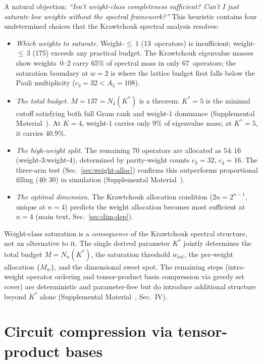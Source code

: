 \documentclass[twocolumn,prx,aps,superscriptaddress,longbibliography,floatfix]{revtex4-2}
\begin{document}
A natural objection: \emph{``Isn't weight-class completeness
sufficient?  Can't I just saturate low weights without the
spectral framework?''}  This heuristic contains four undetermined
choices that the Krawtchouk spectral analysis resolves:
\begin{itemize}
\item \emph{Which weights to saturate.}  Weight-${\le}\,1$
(13~operators) is insufficient; weight-${\le}\,3$ (175) exceeds
any practical budget.  The Krawtchouk eigenvalue masses show
weights~0--2 carry 65\% of spectral mass in only 67~operators; the
saturation boundary at $w = 2$ is where the lattice budget first
falls below the Pauli multiplicity ($c_3 = 32 < A_3 = 108$).
\item \emph{The total budget.}  $M = 137 = N_4(K^*)$ is a theorem:
$K^* = 5$ is the minimal cutoff satisfying both full Gram rank and
weight-$1$ dominance (Supplemental Material~\cite{supplemental}).  At $K = 4$,
weight-$1$ carries only 9\% of eigenvalue mass; at $K^* = 5$, it
carries 40.9\%.
\item \emph{The high-weight split.}  The remaining 70 operators are
allocated as $54{:}16$ (weight-$3$:weight-$4$), determined by
parity-weight counts $c_3 = 32$, $c_4 = 16$.  The three-arm test
(Sec.~\ref{sec:weight-alloc}) confirms this outperforms proportional
filling ($40{:}30$) in simulation
(Supplemental Material~\cite{supplemental}).
\item \emph{The optimal dimension.}  The Krawtchouk allocation
condition ($2n = 2^{n-1}$, unique at $n = 4$) predicts the weight
allocation becomes most sufficient at $n = 4$
(main text, Sec.~\ref{sec:dim-dep}).
\end{itemize}
Weight-class saturation is a \emph{consequence} of the Krawtchouk
spectral structure, not an alternative to it.
The single derived parameter $K^*$ jointly determines the total
budget $M = N_n(K^*)$, the saturation threshold
$w_{\mathrm{sat}}$, the per-weight allocation $\{M_w\}$, and
the dimensional sweet spot.  The remaining steps (intra-weight
operator ordering and tensor-product basis compression via greedy
set cover) are deterministic and parameter-free but do introduce
additional structure beyond $K^*$ alone
(Supplemental Material~\cite{supplemental}, Sec.~IV).


\section{Circuit compression via tensor-product bases}
\label{sec:circuits}
\end{document}
